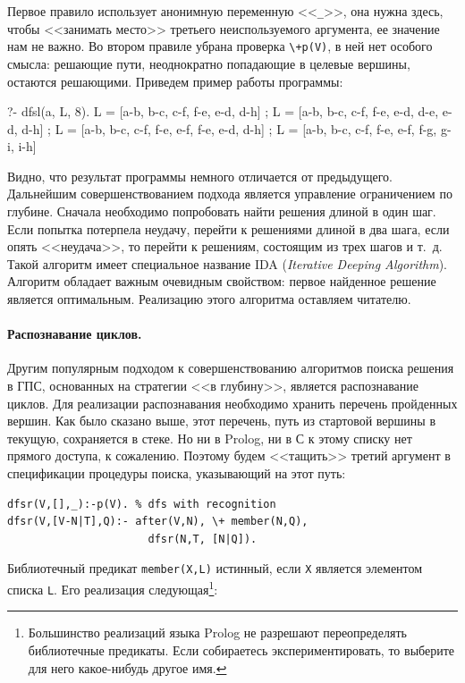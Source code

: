 \documentclass[a4paper,14pt, openany, twoside, final]{extbook} %
\newcommand{\eeng}[1]{\emph{\foreignlanguage{english}{#1}}}
\begin{document}
Первое правило использует анонимную переменную <<\texttt{\_}>>, она нужна здесь, чтобы <<занимать место>> третьего неиспользуемого аргумента, ее значение нам не важно.  Во втором правиле убрана проверка \texttt{\textbackslash +p(V)}, в ней нет особого смысла: решающие пути, неоднократно попадающие в целевые вершины, остаются решающими.  Приведем пример работы программы:

\begin{proexp}
?- dfsl(a, L, 8).
L = [a-b, b-c, c-f, f-e, e-d, d-h] ;
L = [a-b, b-c, c-f, f-e, e-d, d-e, e-d, d-h] ;
L = [a-b, b-c, c-f, f-e, e-f, f-e, e-d, d-h] ;
L = [a-b, b-c, c-f, f-e, e-f, f-g, g-i, i-h]
\end{proexp}

Видно, что результат программы немного отличается от предыдущего.  Дальнейшим совершенствованием подхода является управление ограничением по глубине.  Сначала необходимо попробовать найти решения длиной в один шаг.  Если попытка потерпела неудачу, перейти к решениями длиной в два шага, если опять <<неудача>>, то перейти к решениям, состоящим из трех шагов и т.~д.  Такой алгоритм имеет специальное название IDA (\eeng{Iterative Deeping Algorithm}).  Алгоритм обладает важным очевидным свойством: первое найденное решение является оптимальным.  Реализацию этого алгоритма оставляем читателю.

\paragraph{Распознавание циклов.}  Другим популярным подходом к совершенствованию алгоритмов поиска решения в ГПС, основанных на стратегии <<в глубину>>, является распознавание циклов.  Для реализации распознавания необходимо хранить перечень пройденных вершин.  Как было сказано выше, этот перечень, путь из стартовой вершины в текущую, сохраняется в стеке.  Но ни в Prolog, ни в С к этому списку нет прямого доступа, к сожалению.  Поэтому будем <<тащить>> третий аргумент в спецификации процедуры поиска, указывающий на этот путь:

\begin{verbatim}
dfsr(V,[],_):-p(V). % dfs with recognition
dfsr(V,[V-N|T],Q):- after(V,N), \+ member(N,Q),
                      dfsr(N,T, [N|Q]).
\end{verbatim}


Библиотечный предикат \texttt{member(X,L)} истинный, если \texttt{X} является элементом списка \texttt{L}.  Его реализация следующая\footnote{Большинство реализаций языка Prolog не разрешают переопределять библиотечные предикаты.  Если собираетесь экспериментировать, то выберите для него какое-нибудь другое имя.}:
\end{document}
